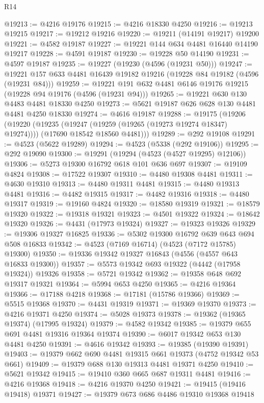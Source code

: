 \begin{lexlean}{R14}
\begin{coremodule}
@19213 := @4216 @19176
@19215 := @4216 @18330 @4250
@19216 := @19213 @19215
@19217 := @19212 @19216
@19220 := @19211 (@14191 @19217) @19200
@19221 := @4582 @19187
@19227 := @19221 @144 @634 @4481 @16440 @14190 @19217
@19228 := @4591 @19187
@19230 := @19228 @50 @14190
@19231 := @4597 @19187
@19235 := @19227 (@19230 (@4596 (@19231 @50)))
@19247 := @19221 @157 @633 @4481 @16439 @19182 @19216 (@19228 @84 @19182 (@4596 (@19231 @84)))
@19259 := @19221 @191 @632 @4481 @6146 @19176 @19215 (@19228 @94 @19176 (@4596 (@19231 @94)))
@19265 := @19221 @630 @130 @4483 @4481 @18330 @4250
@19273 := @5621 @19187 @626 @628 @130 @4481 @4481 @4250 @18330
@19274 := @4616 @19187
@19288 := @19175
    (@19206
      (@19220
        (@19235 (@19247 (@19259 (@19265 (@19273 @19274 @18347) @19274))))
        (@17690 @18542 @18560 @4481)))
@19289 := @292 @19108
@19291 := @4523 (@5622 @19289)
@19294 := @4523 (@5338 (@292 @19106))
@19295 := @292 @19090
@19300 := @19291 (@19294 (@4523 (@4527 @19295) @12106))
@19306 := @5273 @19300 @16792 @618 @101 @636 @697
@19307 := @19109 @4824
@19308 := @17522 @19307
@19310 := @4480 @19308 @4481
@19311 := @4630 @19310
@19313 := @4480 @19311 @4481
@19315 := @4480 @19313 @4481
@19316 := @4482 @19315
@19317 := @4482 @19316
@19318 := @4480 @19317
@19319 := @19160 @4824
@19320 := @18580 @19319
@19321 := @18579 @19320
@19322 := @19318 @19321
@19323 := @4501 @19322
@19324 := @18642 @19320
@19326 := @4431 (@17973 @19324)
@19327 := @19323 @19326
@19329 := @19306 @19327 @16825
@19336 := @5302 @19300 @16792 @639 @643 @694 @508 @16833
@19342 := @4523 (@7169 @16714) (@4523 (@7172 @15785) @19300)
@19350 := @19336 @19342 @19327 @16843 (@4556 (@4557 @643 @16833 @19300))
@19357 := @5573 @19342 @693 @19322 (@4442 (@17958 @19324)) @19326
@19358 := @5721 @19342
@19362 := @19358 @648 @692 @19317 @19321
@19364 := @5994 @653 @4250
@19365 := @4216 @19364
@19366 := @17188 @4218
@19368 := @17181 (@15786 @19366)
@19369 := @5515 @19368
@19370 := @4431 @19319
@19371 := @19369 @19370
@19373 := @4216 @19371 @4250
@19374 := @5028 @19373
@19378 := @19362 (@19365 @19374) (@17995 @19324)
@19379 := @4582 @19342
@19385 := @19379 @655 @691 @4481 @19316 @19364 @19374
@19390 := @6017 @19342 @653 @130 @4481 @4250
@19391 := @4616 @19342
@19393 := @19385 (@19390 @19391)
@19403 := @19379 @662 @690 @4481 @19315 @661 @19373 (@4752 @19342 @53 @661)
@19409 := @19379 @688 @130 @19313 @4481 @19371 @4250
@19410 := @5621 @19342
@19415 := @19410 @360 @665 @687 @19311 @4481
@19416 := @4216 @19368
@19418 := @4216 @19370 @4250
@19421 := @19415 (@19416 @19418) @19371
@19427 := @19379 @673 @686 @4486 @19310 @19368 @19418

\end{coremodule}
\end{lexlean}
